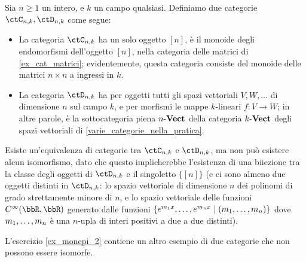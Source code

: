 \begin{example}
	Sia \(n\ge 1\) un intero, e \(k\) un campo qualsiasi. Definiamo due categorie \(\ctC_{n,k},\ctD_{n,k}\) come segue:
	\begin{itemize}
		\item La categoria \(\ctC_{n,k}\) ha un solo oggetto \([n]\), è il monoide degli endomorfismi dell'oggetto \([n]\), nella categoria delle matrici di \ref{ex_cat_matrici}; evidentemente, questa categoria consiste del monoide delle matrici \(n\times n\) a ingressi in \(k\).
		\item La categoria \(\ctD_{n,k}\) ha per oggetti tutti gli spazi vettoriali \(V,W,\dots\) di dimensione \(n\) sul campo \(k\), e per morfismi le mappe \(k\)-lineari \(f : V\to W\); in altre parole, è la sottocategoria piena \(\ctVect[n]\) della categoria \(\ctVect[k]\) degli spazi vettoriali di \ref{varie_categorie_nella_pratica}.
	\end{itemize}
	Esiste un'equivalenza di categorie tra \(\ctC_{n,k}\) e \(\ctD_{n,k}\), ma non può esistere alcun isomorfismo, dato che questo implicherebbe l'esistenza di una biiezione tra la classe degli oggetti di \(\ctD_{n,k}\) e il singoletto \(\{[n]\}\) (e ci sono almeno due oggetti distinti in \(\ctD_{n,k}\): lo spazio vettoriale di dimensione \(n\) dei polinomi di grado strettamente minore di \(n\), e lo spazio vettoriale delle funzioni \(C^\infty(\bbR,\bbR)\) generato dalle funzioni \(\{e^{m_1 x},\dots,e^{m_n x} \mid (\tup mn,)\}\) dove \(\tup mn,\) è una \(n\)-upla di interi positivi a due a due distinti).
\end{example}
L'esercizio \ref{ex_monepi_2} contiene un altro esempio di due categorie che non possono essere isomorfe.

